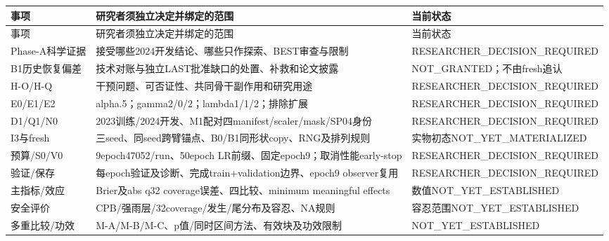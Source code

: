 \documentclass[UTF8,fontset=fandol,10pt]{ctexart}
\begin{document}
\begingroup\small\setlength{\tabcolsep}{3pt}\renewcommand{\arraystretch}{1.12}
\begin{longtable}{>{\raggedright\arraybackslash}p{\dimexpr(\linewidth-6\tabcolsep)/3\relax}>{\raggedright\arraybackslash}p{\dimexpr(\linewidth-6\tabcolsep)/3\relax}>{\raggedright\arraybackslash}p{\dimexpr(\linewidth-6\tabcolsep)/3\relax}}
\toprule
事项 & 研究者须独立决定并绑定的范围 & 当前状态 \\
\midrule\endfirsthead
事项 & 研究者须独立决定并绑定的范围 & 当前状态 \\
\midrule\endhead
Phase-A科学证据 & 接受哪些2024开发结论、哪些只作探索、BEST审查与限制 & RESEARCHER\_\allowbreak{}DECISION\_\allowbreak{}REQUIRED \\
B1历史恢复偏差 & 技术对账与独立LAST批准缺口的处置、补救和论文披露 & NOT\_\allowbreak{}GRANTED；不由fresh追认 \\
H-O/\allowbreak{}H-Q & 干预问题、可否证性、共同骨干副作用和研究用途 & RESEARCHER\_\allowbreak{}DECISION\_\allowbreak{}REQUIRED \\
E0/\allowbreak{}E1/\allowbreak{}E2 & alpha.5；gamma2/\allowbreak{}0/\allowbreak{}2；lambda1/\allowbreak{}1/\allowbreak{}2；排除扩展 & RESEARCHER\_\allowbreak{}DECISION\_\allowbreak{}REQUIRED \\
D1/\allowbreak{}Q1/\allowbreak{}N0 & 2023训练/\allowbreak{}2024开发、M1配对四manifest/\allowbreak{}scaler/\allowbreak{}mask/\allowbreak{}SP04身份 & RESEARCHER\_\allowbreak{}DECISION\_\allowbreak{}REQUIRED \\
I3与fresh & 三seed、同seed跨臂锚点、B0/\allowbreak{}B1同形状copy、RNG及排列规则 & 实物初态NOT\_\allowbreak{}YET\_\allowbreak{}MATERIALIZED \\
预算/\allowbreak{}S0/\allowbreak{}V0 & 9epoch47052/\allowbreak{}run、50epoch LR前缀、固定epoch9；取消性能early-stop & RESEARCHER\_\allowbreak{}DECISION\_\allowbreak{}REQUIRED \\
验证/\allowbreak{}保存 & 每epoch验证及诊断、完成train+validation边界、epoch9 observer复用 & RESEARCHER\_\allowbreak{}DECISION\_\allowbreak{}REQUIRED \\
主指标/\allowbreak{}效应 & Brier及abs q32 coverage误差、四比较、minimum meaningful effects & 数值NOT\_\allowbreak{}YET\_\allowbreak{}ESTABLISHED \\
安全评价 & CPB/\allowbreak{}强雨层/\allowbreak{}32coverage/\allowbreak{}发生/\allowbreak{}尾分布及容忍、NA规则 & 容忍范围NOT\_\allowbreak{}YET\_\allowbreak{}ESTABLISHED \\
多重比较/\allowbreak{}功效 & M-A/\allowbreak{}M-B/\allowbreak{}M-C、p值/\allowbreak{}同时区间方法、有效块及功效限制 & NOT\_\allowbreak{}YET\_\allowbreak{}ESTABLISHED \\

\end{longtable}
\end{document}
